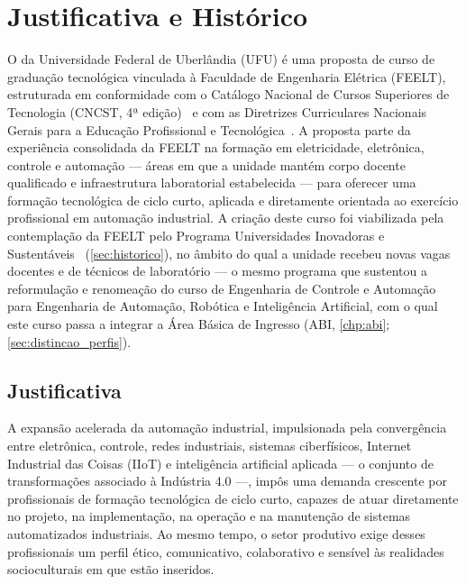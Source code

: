 \chapter{Justificativa e Histórico}
\label{chp:justificativa}

O \ppccurso da Universidade Federal de Uberlândia (UFU) é uma proposta de curso de graduação tecnológica vinculada à Faculdade de Engenharia Elétrica (FEELT), estruturada em conformidade com o Catálogo Nacional de Cursos Superiores de Tecnologia (CNCST, 4ª edição)~\cite{mec_cncst_2024} e com as Diretrizes Curriculares Nacionais Gerais para a Educação Profissional e Tecnológica~\cite{cne_cp_1_2021}. A proposta parte da experiência consolidada da FEELT na formação em eletricidade, eletrônica, controle e automação — áreas em que a unidade mantém corpo docente qualificado e infraestrutura laboratorial estabelecida — para oferecer uma formação tecnológica de ciclo curto, aplicada e diretamente orientada ao exercício profissional em automação industrial. A criação deste curso foi viabilizada pela contemplação da FEELT pelo Programa Universidades Inovadoras e Sustentáveis~\cite{programa_universidades_inovadoras_sustentaveis} (\autoref{sec:historico}), no âmbito do qual a unidade recebeu novas vagas docentes e de técnicos de laboratório — o mesmo programa que sustentou a reformulação e renomeação do curso de Engenharia de Controle e Automação para Engenharia de Automação, Robótica e Inteligência Artificial, com o qual este curso passa a integrar a Área Básica de Ingresso (ABI, \autoref{chp:abi}; \autoref{sec:distincao_perfis}).

\section{Justificativa}

A expansão acelerada da automação industrial, impulsionada pela convergência entre eletrônica, controle, redes industriais, sistemas ciberfísicos, Internet Industrial das Coisas (IIoT) e inteligência artificial aplicada — o conjunto de transformações associado à Indústria 4.0 —, impôs uma demanda crescente por profissionais de formação tecnológica de ciclo curto, capazes de atuar diretamente no projeto, na implementação, na operação e na manutenção de sistemas automatizados industriais. Ao mesmo tempo, o setor produtivo exige desses profissionais um perfil ético, comunicativo, colaborativo e sensível às realidades socioculturais em que estão inseridos.

